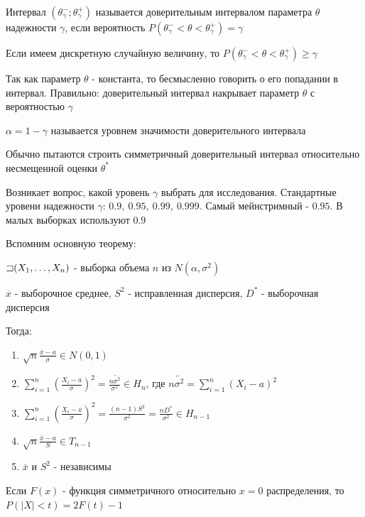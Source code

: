 \documentclass[12pt]{article}
\begin{document}
\Def Интервал $(\theta^-_\gamma; \theta^+_\gamma)$ называется доверительным интервалом параметра $\theta$
надежности $\gamma$, если вероятность $P(\theta^-_\gamma < \theta < \theta^+_\gamma) = \gamma$

\Nota Если имеем дискретную случайную величину, то $P(\theta^-_\gamma < \theta < \theta^+_\gamma) \geq \gamma$

\Notas Так как параметр $\theta$ - константа, то бесмысленно говорить о его попадании в интервал. Правильно: 
доверительный интервал накрывает параметр $\theta$ с вероятностью $\gamma$

 $\alpha = 1 - \gamma$ называется уровнем значимости доверительного интервала

 Обычно пытаются строить симметричный доверительный интервал относительно несмещенной оценки $\theta^*$

 Возникает вопрос, какой уровень $\gamma$ выбрать для исследования.
Стандартные уровени надежности $\gamma$: $0.9, \ 0.95, \ 0.99, \ 0.999$. Самый мейнстримный - $0.95$. 
В малых выборках используют $0.9$

Вспомним основную теорему:

\begin{MyTheorem}
    $\mathord{\sqsupset} (X_1, \dots, X_n)$ - выборка объема $n$ из $N(\alpha, \sigma^2)$

    $\overline{x}$ - выборочное среднее, $S^2$ - исправленная дисперсия, $D^*$ - выборочная дисперсия

    Тогда:

    \begin{enumerate}
        \item $\sqrt{n} \frac{\overline{x} - a}{\sigma} \in N(0, 1)$
        \item $\sum_{i = 1}^n \left(\frac{X_i - a}{\sigma}\right)^2 = \frac{n \tilde{\sigma^2}}{\sigma^2} \in H_n$, 
        где $n \tilde{\sigma^2} = \sum_{i = 1}^n (X_i - a)^2$
        \item $\sum_{i = 1}^n \left(\frac{X_i - \overline{x}}{\sigma}\right)^2 = \frac{(n - 1)S^2}{\sigma^2} = 
        \frac{nD^*}{\sigma^2} \in H_{n - 1}$
        \item $\sqrt{n} \frac{\overline{x} - a}{S} \in T_{n - 1}$
        \item $\overline{x}$ и $S^2$ - независимы
    \end{enumerate}
\end{MyTheorem}


\Nota Если $F(x)$ - функция симметричного относительно $x = 0$ распределения, то $P(|X| < t) = 2F(t) - 1$
\end{document}
